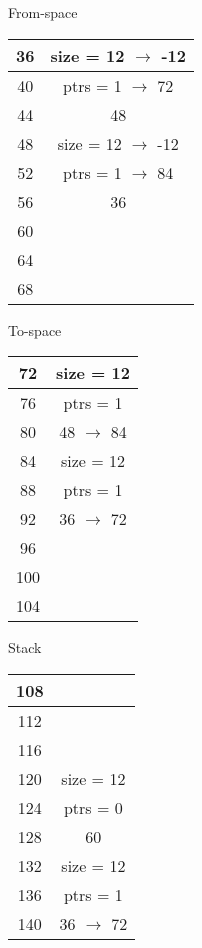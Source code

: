 \documentclass[12pt, letterpaper]{article}
\begin{document}
\begin{minipage}[t]{0.5\textwidth}
	\begin{center}
		From-space\\
		\begin{tabular}{|c|c|}
			\hline
			36 & size = 12 \(\rightarrow\) -12\\
			\hline
			40 & ptrs = 1 \(\rightarrow\) 72\\
			\hline
			44 & 48\\
			\hline
			48 & size = 12 \(\rightarrow\) -12\\
			\hline
			52 & ptrs = 1 \(\rightarrow\) 84\\
			\hline
			56 & 36\\
			\hline
			60 & \\
			\hline			
			64 & \\
			\hline			
			68 & \\
			\hline
		\end{tabular}
		
		\vspace{7mm}
		
		To-space\\
		\begin{tabular}{|c|c|}
			\hline
			72 & size = 12 \\
			\hline
			76 & ptrs = 1 \\
			\hline
			80 & 48 \(\rightarrow\) 84 \\
			\hline
			84 & size = 12\\
			\hline
			88 & ptrs = 1 \\
			\hline
			92 & 36 \(\rightarrow\) 72\\
			\hline
			96 & \\
			\hline			
			100 & \\
			\hline			
			104 & \\
			\hline
		\end{tabular}
		
		\vspace{7mm}
		
		Stack\\
		\begin{tabular}{|c|c|}
			\hline
			108 & \\
			\hline			
			112 & \\
			\hline			
			116 & \\
			\hline			
			120 & size = 12 \\
			\hline
			124 & ptrs = 0 \\
			\hline
			128 & 60 \\
			\hline
			132 & size = 12 \\
			\hline
			136 & ptrs = 1 \\
			\hline
			140 & 36 \(\rightarrow\) 72 \\
			\hline
		\end{tabular}				
	\end{center}
\end{minipage}
\end{document}
